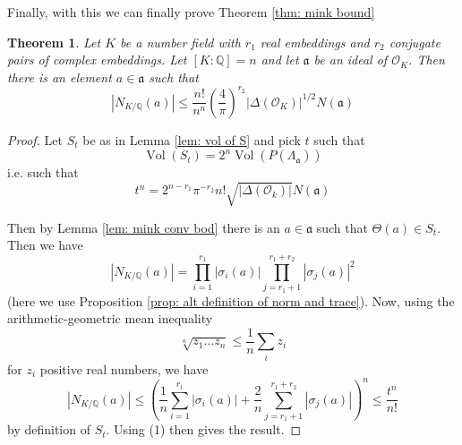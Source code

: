 \documentclass[11pt,a4paper]{report}
\theoremstyle{plain}
\newtheorem*{thm*}{Theorem}
\theoremstyle{definition}
\theoremstyle{definition}
\def\QQ{\mathbb{Q}}
\def \s {\sigma}
\def \OO {\mathcal{O}}
\def \s {\sigma}
\def\gotha{\mathfrak{a}}
\DeclareMathOperator{\Vol}{Vol}
\begin{document}
	Finally, with this we can finally prove Theorem \ref{thm: mink bound}
	
	\begin{thm*}
		Let $K$ be a number field with $r_1$ real embeddings and $r_2$ conjugate pairs of complex embeddings. Let $[K:\QQ]=n$ and let $\gotha$ be an ideal of $\OO_K$. Then there is an element $a \in \gotha$ such that \[|N_{K/\QQ}(a)| \leq  \frac{n!}{n^n} \left( \frac{4}{\pi} \right)^{r_2} |\Delta(\OO_K)|^{1/2} N(\gotha) \]
	\end{thm*} 
	
	\begin{proof}
		Let $S_t$ be as in Lemma \ref{lem: vol of S} and pick $t$ such that \[\Vol(S_t)=2^n \Vol(P(\Lambda_\gotha))\] i.e. such that \[t^n=2^{n-r_1}\pi^{-r_2}n! \sqrt{|\Delta(\OO_k)|} N(\gotha) \tag{1}\]	
		
		Then by Lemma \ref{lem: mink conv bod} there is an $a \in \gotha$ such that $\Theta(a) \in S_t$. Then we have \[|N_{K/\QQ}(a)|= \prod_{i=1}^{r_1} |\s_i(a)| \prod_{j=r_1+1}^{r_1+r_2} |\s_j(a)|^2 \] (here we use Proposition \ref{prop: alt definition of norm and trace}). Now, using the arithmetic-geometric mean inequality \[\sqrt[n]{z_1\dots z_n} \leq \frac{1}{n} \sum_i z_i\] for $z_i$ positive real numbers, we have \[|N_{K/\QQ}(a)| \leq \left( \frac{1}{n}\sum_{i=1}^{r_1} |\s_i(a)|+ \frac{2}{n}\sum_{j=r_1+1}^{r_1+r_2} |\s_j(a)| \right)^n \leq \frac{t^n}{n!}\] by definition of $S_t$. 	Using (1) then gives the result.
		
	\end{proof}
	
	
	
	
	
	
	
	
	
	
	
	
	
	
\end{document}
